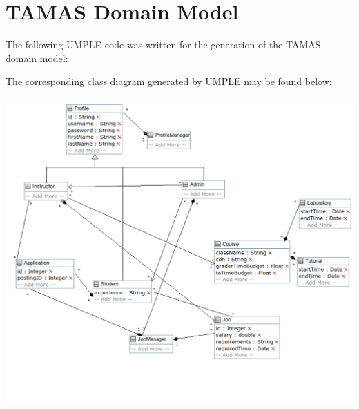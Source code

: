 \documentclass[12pt]{report}
\begin{document}
\chapter{TAMAS Domain Model}
The following UMPLE code was written for the generation of the TAMAS domain model:

The corresponding class diagram generated by UMPLE may be found below:\\\\
\includegraphics[scale=0.6]{model/Diagrams/classdiagram}
\end{document}
